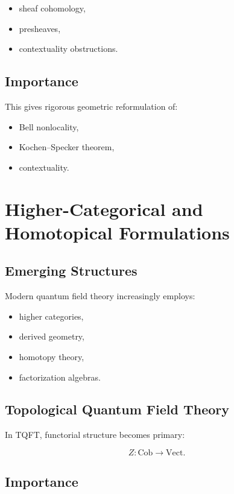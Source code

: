 \documentclass[11pt]{article}
\begin{document}
\begin{itemize}
\item sheaf cohomology,
\item presheaves,
\item contextuality obstructions.
\end{itemize}

\subsection{Importance}

This gives rigorous geometric reformulation of:

\begin{itemize}
\item Bell nonlocality,
\item Kochen--Specker theorem,
\item contextuality.
\end{itemize}

\section{Higher-Categorical and Homotopical Formulations}

\subsection{Emerging Structures}

Modern quantum field theory increasingly employs:

\begin{itemize}
\item higher categories,
\item derived geometry,
\item homotopy theory,
\item factorization algebras.
\end{itemize}

\subsection{Topological Quantum Field Theory}

In TQFT, functorial structure becomes primary:

\[
Z:
\mathrm{Cob}
\rightarrow
\mathrm{Vect}.
\]

\subsection{Importance}
\end{document}
